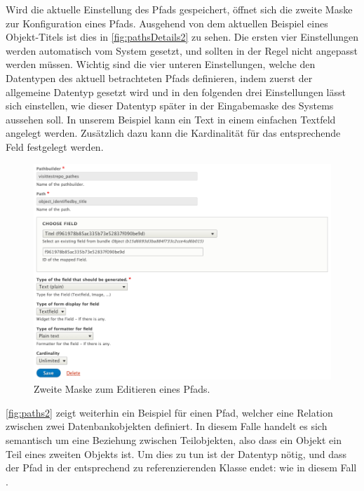 Wird die aktuelle Einstellung des Pfads gespeichert, öffnet sich die zweite Maske zur Konfiguration eines \wisski Pfads. Ausgehend von dem aktuellen Beispiel eines Objekt-Titels ist dies in \autoref{fig:pathsDetails2} zu sehen. Die ersten vier Einstellungen werden automatisch vom System gesetzt, und sollten in der Regel nicht angepasst werden müssen. Wichtig sind die vier unteren Einstellungen, welche den Datentypen des aktuell betrachteten Pfads definieren, indem zuerst der allgemeine Datentyp gesetzt wird und in den folgenden drei Einstellungen lässt sich einstellen, wie dieser Datentyp später in der Eingabemaske des \wisski Systems aussehen soll. In unserem Beispiel kann ein Text in einem einfachen Textfeld angelegt werden. Zusätzlich dazu kann die Kardinalität für das entsprechende Feld festgelegt werden.

\begin{figure}[htb]
    \centering
    \includegraphics[width=\textwidth]{Figures/berndl/pathsDetails2}
    \caption{\label{fig:pathsDetails2} Zweite Maske zum Editieren eines \wisski Pfads.}
\end{figure}

\autoref{fig:paths2} zeigt weiterhin ein Beispiel für einen Pfad, welcher eine Relation zwischen zwei Datenbankobjekten definiert. In diesem Falle handelt es sich semantisch um eine Beziehung zwischen Teilobjekten, also dass ein Objekt ein Teil eines zweiten Objekts ist. Um dies zu tun ist der Datentyp \texttt{} nötig, und dass der Pfad in der entsprechend zu referenzierenden Klasse endet: wie in diesem Fall \texttt{}.

